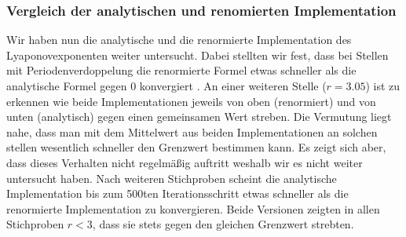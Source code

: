 \documentclass[12pt,a4paper]{article}
\begin{document}
\subsubsection{Vergleich der analytischen und renomierten Implementation}
Wir haben nun die analytische und die renormierte Implementation des Lyaponovexponenten weiter untersucht. Dabei stellten wir fest, dass bei Stellen mit Periodenverdoppelung die renormierte Formel etwas schneller als die analytische Formel gegen 0 konvergiert . An einer weiteren Stelle ($r=3.05$) ist zu erkennen wie beide Implementationen jeweils von oben (renormiert) und von unten (analytisch) gegen einen gemeinsamen Wert streben. 
Die Vermutung liegt nahe, dass man mit dem Mittelwert aus beiden Implementationen an solchen stellen wesentlich schneller den Grenzwert bestimmen kann. Es zeigt sich aber, dass dieses Verhalten nicht regelmäßig auftritt weshalb wir es nicht weiter untersucht haben. Nach weiteren Stichproben scheint die analytische Implementation bis zum 500ten Iterationsschritt etwas schneller als die renormierte Implementation zu konvergieren. Beide Versionen zeigten in allen Stichproben $r<3$, dass sie stets gegen den gleichen Grenzwert strebten.
\end{document}
